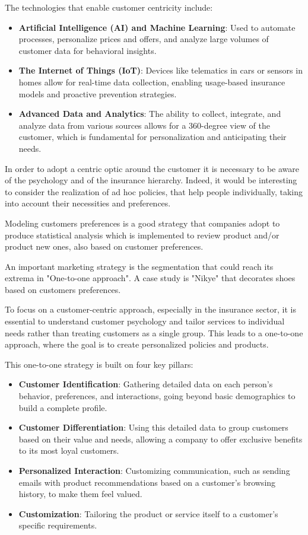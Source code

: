 \documentclass{article}
\begin{document}
The technologies that enable customer centricity include:
\begin{itemize}
\item \textbf{Artificial Intelligence (AI) and Machine Learning}: Used to automate processes, personalize prices and offers, and analyze large volumes of customer data for behavioral insights.
\item \textbf{The Internet of Things (IoT)}: Devices like telematics in cars or sensors in homes allow for real-time data collection, enabling usage-based insurance models and proactive prevention strategies.
\item \textbf{Advanced Data and Analytics}: The ability to collect, integrate, and analyze data from various sources allows for a 360-degree view of the customer, which is fundamental for personalization and anticipating their needs.
\end{itemize}

In order to adopt a centric optic around the customer it is necessary to be aware of the psychology and of the insurance hierarchy.
Indeed, it would be interesting to consider the realization of ad hoc policies, that help people individually, taking into account their necessities and preferences.

Modeling customers preferences is a good strategy that companies adopt to produce statistical analysis which is implemented to review product and/or product new ones, also based on customer preferences.

An important marketing strategy is the segmentation that could reach its extrema in "One-to-one approach". A case study is "Nikye" that decorates shoes based on customers preferences.

To focus on a customer-centric approach, especially in the insurance sector, it is essential to understand customer psychology and tailor services to individual needs rather than treating customers as a single group. This leads to a one-to-one approach, where the goal is to create personalized policies and products.

This one-to-one strategy is built on four key pillars:
\begin{itemize}
\item \textbf{Customer Identification}: Gathering detailed data on each person's behavior, preferences, and interactions, going beyond basic demographics to build a complete profile.
\item \textbf{Customer Differentiation}: Using this detailed data to group customers based on their value and needs, allowing a company to offer exclusive benefits to its most loyal customers.
\item \textbf{Personalized Interaction}: Customizing communication, such as sending emails with product recommendations based on a customer's browsing history, to make them feel valued.
\item \textbf{Customization}: Tailoring the product or service itself to a customer’s specific requirements.
\end{itemize}
\end{document}

